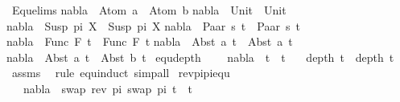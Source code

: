 \begin{isabellebody}
\isanewline
{}\isamarkupfalse%
\ Equ{\isacharunderscore}{\kern0pt}elims{\isacharcolon}{\kern0pt}\isanewline
{\isachardoublequoteopen}nabla\ {\isasymturnstile}\ Atom\ a\ {\isasymapprox}\ Atom\ b{\isachardoublequoteclose}\isanewline
{\isachardoublequoteopen}nabla\ {\isasymturnstile}\ Unit\ {\isasymapprox}\ Unit{\isachardoublequoteclose}\isanewline
{\isachardoublequoteopen}nabla\ {\isasymturnstile}\ Susp\ pi{}\ X\ {\isasymapprox}\ Susp\ pi{}\ X{\isachardoublequoteclose}\isanewline
{\isachardoublequoteopen}nabla\ {\isasymturnstile}\ Paar\ s{}\ t{}\ {\isasymapprox}\ Paar\ s{}\ t{}{\isachardoublequoteclose}\isanewline
{\isachardoublequoteopen}nabla\ {\isasymturnstile}\ Func\ F\ t{}\ {\isasymapprox}\ Func\ F\ t{}{\isachardoublequoteclose}\isanewline
{\isachardoublequoteopen}nabla\ {\isasymturnstile}\ Abst\ a\ t{}\ {\isasymapprox}\ Abst\ a\ t{}{\isachardoublequoteclose}\isanewline
{\isachardoublequoteopen}nabla\ {\isasymturnstile}\ Abst\ a\ t{}\ {\isasymapprox}\ Abst\ b\ t{}{\isachardoublequoteclose}\isanewline
\isanewline
{}\isamarkupfalse%
\ equ{\isacharunderscore}{\kern0pt}depth{\isacharcolon}{\kern0pt}\ \isanewline
\ \ \ {\isachardoublequoteopen}nabla\ {\isasymturnstile}\ t{}\ {\isasymapprox}\ t{}{\isachardoublequoteclose}\isanewline
\ \ \ {\isachardoublequoteopen}depth\ t{}\ {\isacharequal}{\kern0pt}\ depth\ t{}{\isachardoublequoteclose}\isanewline
%
\isadelimproof
\ \ %
\endisadelimproof
%
\isatagproof
{}\isamarkupfalse%
\ assms\ \isamarkupfalse%
\ {\isacharparenleft}{\kern0pt}rule\ equ{\isachardot}{\kern0pt}induct{\isacharcomma}{\kern0pt}\ simp{\isacharunderscore}{\kern0pt}all{\isacharparenright}{\kern0pt}%
\endisatagproof
{\isafoldproof}%
%
\isadelimproof
\isanewline
%
\endisadelimproof
\isanewline
{}\isamarkupfalse%
\ rev{\isacharunderscore}{\kern0pt}pi{\isacharunderscore}{\kern0pt}pi{\isacharunderscore}{\kern0pt}equ{\isacharcolon}{\kern0pt}\ \isanewline
\ \ \ {\isachardoublequoteopen}{\isacharparenleft}{\kern0pt}nabla\ {\isasymturnstile}\ swap\ {\isacharparenleft}{\kern0pt}rev\ pi{\isacharparenright}{\kern0pt}\ {\isacharparenleft}{\kern0pt}swap\ pi\ t{\isacharparenright}{\kern0pt}\ {\isasymapprox}\ t{\isacharparenright}{\kern0pt}{\isachardoublequoteclose}\isanewline
%
\isadelimproof

\end{isabellebody}
